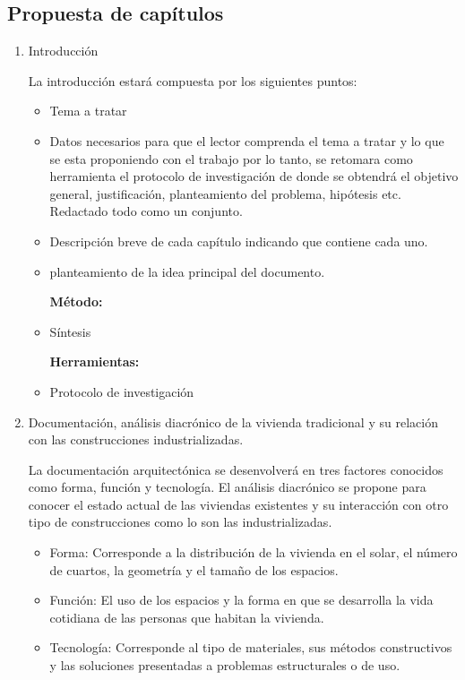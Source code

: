 \subsection{Propuesta de capítulos}
\begin{enumerate}
  \item Introducción

    La introducción estará compuesta por los siguientes puntos:
  \begin{itemize}
    \item Tema a tratar
    \item Datos necesarios para que el lector comprenda el tema a tratar y lo que se esta proponiendo con el trabajo por lo tanto, se retomara como herramienta el protocolo de investigación de donde se obtendrá el objetivo general, justificación, planteamiento del problema, hipótesis etc. Redactado todo como un conjunto.
    \item Descripción breve de cada capítulo indicando que contiene cada uno.
    \item planteamiento de la idea principal del documento.

      \textbf{Método:}
    \item Síntesis

      \textbf{Herramientas:}
      \item Protocolo de investigación

  \end{itemize} 
  \item Documentación, análisis diacrónico de la vivienda tradicional y su relación con las construcciones industrializadas.

    La documentación arquitectónica se desenvolverá en tres factores conocidos como forma, función y tecnología. El análisis diacrónico se propone para conocer el estado actual de las viviendas existentes y su interacción con otro tipo de construcciones como lo son las industrializadas.

    \begin{itemize}
      \item Forma: Corresponde a la distribución de la vivienda en el solar, el número de cuartos, la geometría y el tamaño de los espacios.
      \item Función: El uso de los espacios y la forma en que se desarrolla la vida cotidiana de las personas que habitan la vivienda.
      \item Tecnología: Corresponde al tipo de materiales, sus métodos constructivos y las soluciones presentadas a problemas estructurales o de uso.


\end{itemize}
\end{enumerate}
